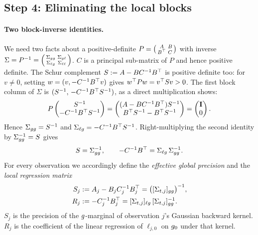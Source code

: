\subsection{Step 4: Eliminating the local blocks}\label{sec:elimination}

\paragraph{Two block-inverse identities.}
We need two facts about a positive-definite $P=\begin{psmallmatrix}A&B\\B^\top&C\end{psmallmatrix}$ with inverse $\Sigma=P^{-1}=\begin{psmallmatrix}\Sigma_{gg}&\Sigma_{g\ell}\\\Sigma_{\ell g}&\Sigma_{\ell\ell}\end{psmallmatrix}$.
$C$ is a principal sub-matrix of $P$ and hence positive definite.
The Schur complement $S:=A-BC^{-1}B^\top$ is positive definite too: for $v\neq0$, setting $w=(v,-C^{-1}B^\top v)$ gives $w^\top Pw=v^\top Sv>0$.
The first block column of $\Sigma$ is $(S^{-1},\,-C^{-1}B^\top S^{-1})$, as a direct multiplication shows:
\[
  P\begin{pmatrix}S^{-1}\\-C^{-1}B^\top S^{-1}\end{pmatrix}
  =\begin{pmatrix}(A-BC^{-1}B^\top)S^{-1}\\B^\top S^{-1}-B^\top S^{-1}\end{pmatrix}
  =\begin{pmatrix}\mathbf{I}\\0\end{pmatrix}.
\]
Hence $\Sigma_{gg}=S^{-1}$ and $\Sigma_{\ell g}=-C^{-1}B^\top S^{-1}$.
Right-multiplying the second identity by $\Sigma_{gg}^{-1}=S$ gives
\begin{equation}\label{eq:block-identities}
  S=\Sigma_{gg}^{-1},\qquad -C^{-1}B^\top=\Sigma_{\ell g}\,\Sigma_{gg}^{-1}.
\end{equation}
For every observation we accordingly define the \emph{effective global precision} and the \emph{local regression matrix}
\begin{equation}\label{eq:S-R}
\begin{aligned}
  S_j&:=A_j-B_jC_j^{-1}B_j^\top=\big([\Sigma_{t,j}]_{gg}\big)^{-1},\\
  R_j&:=-C_j^{-1}B_j^\top=[\Sigma_{t,j}]_{\ell g}\,[\Sigma_{t,j}]_{gg}^{-1}.
\end{aligned}
\end{equation}
$S_j$ is the precision of the $g$-marginal of observation $j$'s Gaussian backward kernel.
$R_j$ is the coefficient of the linear regression of $\ell_{j,0}$ on $g_0$ under that kernel.

